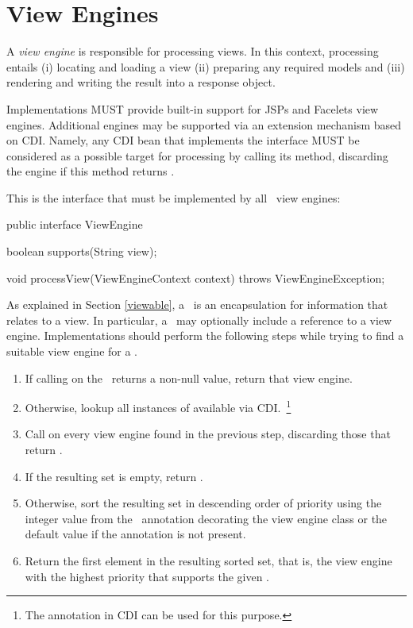 \chapter{View Engines}
\label{view_engines}

A {\em view engine} is responsible for processing views. In this context, processing entails
(i) locating and loading a view (ii) preparing any required models and (iii) rendering and 
writing the result into a response object. 

Implementations MUST provide built-in support for JSPs and Facelets view engines. Additional
engines may be supported via an extension mechanism based on CDI. Namely, any CDI bean
that implements the  interface MUST be considered as
a possible target for processing by calling its  method, discarding the
engine if this method returns .

This is the interface that must be implemented by all \mvc\ view engines:

\begin{listing}{1}
public interface ViewEngine {

    boolean supports(String view);

    void processView(ViewEngineContext context) throws ViewEngineException;
}
\end{listing}

As explained in Section \ref{viewable}, a \Viewable\ is an encapsulation for information
that relates to a view. In particular, a \Viewable\ may optionally include a reference to a
view engine. Implementations should perform the following steps while trying to find
a suitable view engine for a \Viewable.

\begin{enumerate}
\item If calling  on the \Viewable\ returns a non-null value, return
that view engine.
\item Otherwise, lookup all instances of  available via CDI.~\footnote{The  annotation in CDI can be used for this purpose.}
\item Call  on every view engine found in the previous step, discarding
those that return .
\item If the resulting set is empty, return .
\item Otherwise, sort the resulting set in descending order of priority using the integer value 
from the \Priority\ annotation decorating the view engine class or the default value  if the annotation is not present.
\item Return the first element in the resulting sorted set, that is, the view engine with
the highest priority that supports the given \Viewable.
\end{enumerate}

